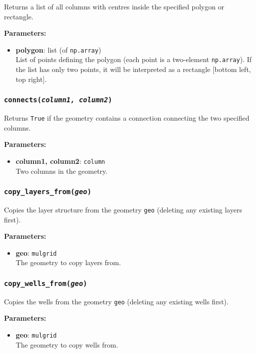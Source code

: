 Returns a list of all columns with centres inside the specified polygon or rectangle.

\textbf{Parameters:}
\begin{itemize}
\item \textbf{polygon}: list (of \texttt{np.array})\\
  List of points defining the polygon (each point is a two-element \texttt{np.array}).  If the list has only two points, it will be interpreted as a rectangle [bottom left, top right].
\end{itemize}

\subsubsection{\texttt{connects(\emph{column1, column2})}}
\label{sec:connects}

Returns \texttt{True} if the geometry contains a connection connecting the two specified columns.

\textbf{Parameters:}
\begin{itemize}
\item \textbf{column1, column2}: \texttt{column}\\
  Two columns in the geometry.
\end{itemize}

\subsubsection{\texttt{copy\_layers\_from(\emph{geo})}}
\label{sec:copy_layers_from}

Copies the layer structure from the geometry \texttt{geo} (deleting any existing layers first).

\textbf{Parameters:}
\begin{itemize}
\item \textbf{geo}: \texttt{mulgrid}\\
  The geometry to copy layers from.
\end{itemize}

\subsubsection{\texttt{copy\_wells\_from(\emph{geo})}}
\label{sec:copy_wells_from}

Copies the wells from the geometry \texttt{geo} (deleting any existing wells first).

\textbf{Parameters:}
\begin{itemize}
\item \textbf{geo}: \texttt{mulgrid}\\
  The geometry to copy wells from.
\end{itemize}

